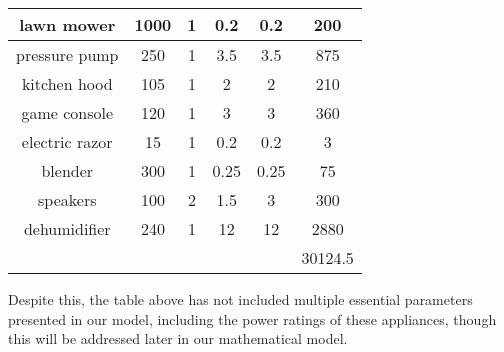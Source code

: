 \begin{table}[H]
\begin{tabular}{|c|c|c|c|c|c|}
    \midrule
    lawn mower & 1000  & 1     & 0.2   & 0.2   & 200 \\
    \midrule
    pressure pump & 250   & 1     & 3.5   & 3.5   & 875 \\
    \midrule
    kitchen hood & 105   & 1     & 2     & 2     & 210 \\
    \midrule
    game console & 120   & 1     & 3     & 3     & 360 \\
    \midrule
    electric razor & 15    & 1     & 0.2   & 0.2   & 3 \\
    \midrule
    blender & 300   & 1     & 0.25  & 0.25  & 75 \\
    \midrule
    speakers & 100   & 2     & 1.5   & 3     & 300 \\
    \midrule
    dehumidifier & 240   & 1     & 12    & 12    & 2880 \\
    \midrule
     &       &       &       &       & 30124.5 \\
    \bottomrule
    \end{tabular}%
  \label{tab:tabl1}%
\end{table}%
\newpage
Despite this, the table above has not included multiple essential parameters presented in our model, including the power ratings of these appliances, though this will be addressed later in our mathematical model.